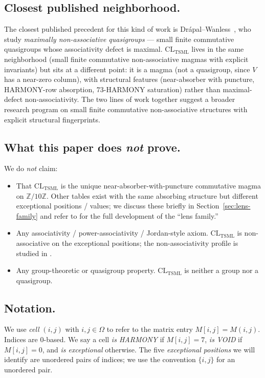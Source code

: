 \documentclass[11pt,reqno]{amsart}
\theoremstyle{plain}
\theoremstyle{definition}
\theoremstyle{remark}
\newcommand{\Z}{\mathbb{Z}}
\newcommand{\TSML}{\mathrm{TSML}}
\newcommand{\CL}{\mathrm{CL}}
\begin{document}
\subsection{Closest published neighborhood.}
The closest published precedent for this kind of work is
Drápal--Wanless~\cite{DrapalWanless2021}, who study
\emph{maximally non-associative quasigroups} --- small finite
commutative quasigroups whose associativity defect is maximal.
$\CL_{\TSML}$ lives in the same neighborhood (small finite
commutative non-associative magmas with explicit invariants) but
sits at a different point: it is a magma (not a quasigroup, since
$V$ has a near-zero column), with structural features (near-absorber
with puncture, HARMONY-row absorption, $73$-HARMONY saturation)
rather than maximal-defect non-associativity. The two lines of work
together suggest a broader research program on small finite
commutative non-associative structures with explicit structural
fingerprints.

\subsection{What this paper does \emph{not} prove.}
We do \emph{not} claim:

\begin{itemize}
\item That $\CL_{\TSML}$ is the unique near-absorber-with-puncture
commutative magma on $\Z/10\Z$. Other tables exist with the same
absorbing structure but different exceptional positions / values; we
discuss these briefly in Section~\ref{sec:lens-family} and refer to
\cite{SandersGishFourCore} for the full development of the
``lens family.''
\item Any associativity / power-associativity / Jordan-style axiom.
$\CL_{\TSML}$ is non-associative on the exceptional positions; the
non-associativity profile is studied in
\cite{SandersGishFourCore}.
\item Any group-theoretic or quasigroup property. $\CL_{\TSML}$ is
neither a group nor a quasigroup.
\end{itemize}

\subsection{Notation.}
We use \emph{cell} $(i, j)$ with $i, j \in \Omega$ to refer to the
matrix entry $M[i, j] = M(i, j)$. Indices are $0$-based. We say a
cell \emph{is HARMONY} if $M[i, j] = 7$, \emph{is VOID} if $M[i, j]
= 0$, and \emph{is exceptional} otherwise. The five \emph{exceptional
positions} we will identify are unordered pairs of indices; we use
the convention $\{i, j\}$ for an unordered pair.
\end{document}
